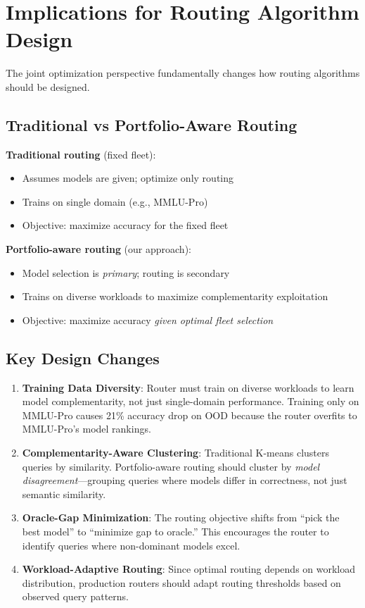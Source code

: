\documentclass[11pt,a4paper]{article}
\begin{document}
\section{Implications for Routing Algorithm Design}

The joint optimization perspective fundamentally changes how routing algorithms should be designed.

\subsection{Traditional vs Portfolio-Aware Routing}

\textbf{Traditional routing} (fixed fleet):
\begin{itemize}
    \item Assumes models are given; optimize only routing
    \item Trains on single domain (e.g., MMLU-Pro)
    \item Objective: maximize accuracy for the fixed fleet
\end{itemize}

\textbf{Portfolio-aware routing} (our approach):
\begin{itemize}
    \item Model selection is \emph{primary}; routing is secondary
    \item Trains on diverse workloads to maximize complementarity exploitation
    \item Objective: maximize accuracy \emph{given optimal fleet selection}
\end{itemize}

\subsection{Key Design Changes}

\begin{enumerate}
    \item \textbf{Training Data Diversity}: Router must train on diverse workloads to learn model complementarity, not just single-domain performance. Training only on MMLU-Pro causes 21\% accuracy drop on OOD because the router overfits to MMLU-Pro's model rankings.
    
    \item \textbf{Complementarity-Aware Clustering}: Traditional K-means clusters queries by similarity. Portfolio-aware routing should cluster by \emph{model disagreement}---grouping queries where models differ in correctness, not just semantic similarity.
    
    \item \textbf{Oracle-Gap Minimization}: The routing objective shifts from ``pick the best model'' to ``minimize gap to oracle.'' This encourages the router to identify queries where non-dominant models excel.
    
    \item \textbf{Workload-Adaptive Routing}: Since optimal routing depends on workload distribution, production routers should adapt routing thresholds based on observed query patterns.
\end{enumerate}
\end{document}
